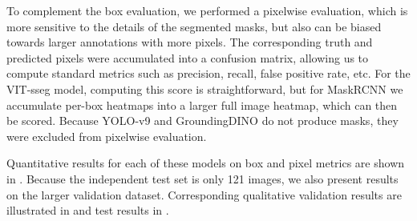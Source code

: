 To complement the box evaluation, we performed a pixelwise evaluation, which is more sensitive to the
  details of the segmented masks, but also can be biased towards larger annotations with more pixels.
The corresponding truth and predicted pixels were accumulated into a confusion matrix, allowing us to
  compute standard metrics \cite{powers_evaluation_2011} such as precision, recall, false positive rate, etc.
For the VIT-sseg model, computing this score is straightforward, but for MaskRCNN we accumulate per-box
  heatmaps into a larger full image heatmap, which can then be scored.
Because YOLO-v9 and GroundingDINO do not produce masks, they were excluded from pixelwise evaluation.

Quantitative results for each of these models on box and pixel metrics are shown in
  .
Because the independent test set is only 121 images, we also present results on the larger validation
  dataset.
Corresponding qualitative validation results are illustrated in  and
test results in .


\newcommand{\tb}[1]{\textbf{#1}}

